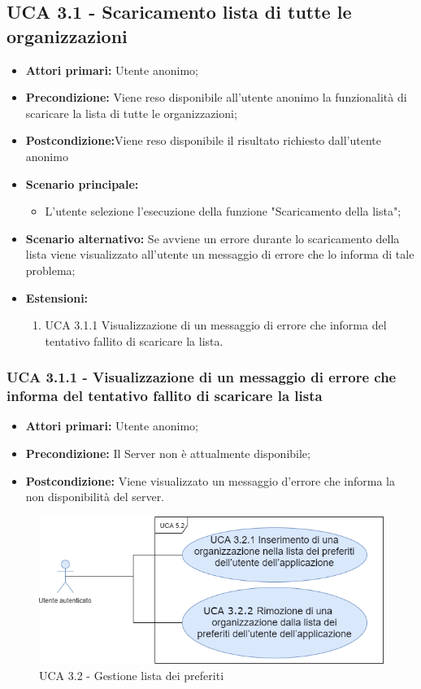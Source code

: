 \subsection{UCA 3.1 - Scaricamento lista di tutte le organizzazioni}%
\begin{itemize}
\item \textbf{Attori primari:} Utente anonimo;
\item \textbf{Precondizione:} Viene reso disponibile all’utente anonimo la funzionalità di scaricare la lista di tutte le organizzazioni;
\item \textbf{Postcondizione:}Viene reso disponibile il risultato richiesto dall’utente anonimo
\item \textbf{Scenario principale:} 
\begin{itemize}
	\item L'utente selezione l'esecuzione della funzione "Scaricamento della lista";
\end{itemize}
\item \textbf{Scenario alternativo:}  Se avviene un errore durante lo scaricamento della lista viene visualizzato all’utente un messaggio di errore che lo informa di tale problema;
\item \textbf{Estensioni:}
	\begin{enumerate}
	\item UCA 3.1.1 Visualizzazione di un messaggio di errore che informa del tentativo fallito di scaricare la lista.
\end{enumerate}
  
\end{itemize}

\subsubsection{UCA 3.1.1 - Visualizzazione di un messaggio di errore che informa del tentativo fallito di scaricare la lista}%
\begin{itemize}
\item \textbf{Attori primari:} Utente anonimo;
\item \textbf{Precondizione:} Il Server non è attualmente disponibile;
\item \textbf{Postcondizione:} Viene visualizzato un messaggio d’errore che informa la non disponibilità del server.

\end{itemize}

\begin{figure}[h]
	\centering
	\caption{UCA 3.2 - Gestione lista dei preferiti}
	\includegraphics[scale=0.5]{sezioni/UseCase/Immagini/UCA3.2.png}
\end{figure}


